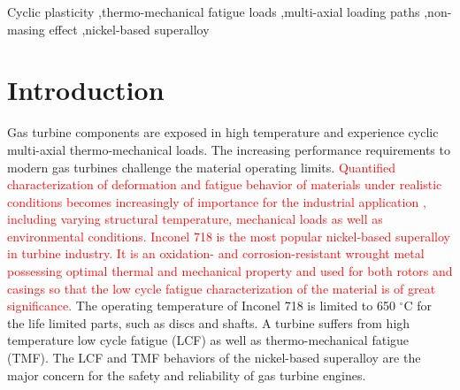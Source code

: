 \documentclass[preprint,5p,twocolumn,11pt,sort&compress]{elsarticle}
\newcommand{\marked}[1]{\textcolor{red}{#1}}
\begin{document}
\begin{frontmatter}
%
\begin{keyword}
Cyclic plasticity \sep thermo-mechanical fatigue loads  \sep multi-axial loading paths \sep non-masing effect \sep nickel-based superalloy 
\end{keyword}
\end{frontmatter}

\section{Introduction}
\noindent Gas turbine components are exposed in high temperature and experience cyclic multi-axial thermo-mechanical loads. The increasing performance requirements to modern gas turbines challenge the material operating limits. \marked{Quantified characterization of deformation and fatigue behavior of materials under realistic conditions becomes increasingly of importance for the industrial application \cite{harrison1996modelling}, including varying structural temperature, mechanical loads as well as environmental conditions. Inconel 718 is the most popular nickel-based superalloy in turbine industry. It is an oxidation- and corrosion-resistant wrought metal possessing optimal thermal and mechanical property and used for both rotors and casings so that the low cycle fatigue characterization of the material is of great significance.} The operating temperature of Inconel 718 is limited to 650 $^{\circ}$C for the life limited parts, such as discs and shafts.
A turbine suffers from high temperature low cycle fatigue (LCF) as well as thermo-mechanical fatigue (TMF).
The LCF and TMF behaviors of the nickel-based superalloy are the major concern for the safety and reliability of gas turbine engines.
\end{document}
